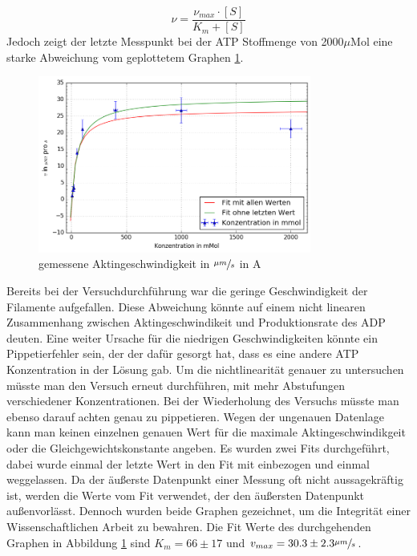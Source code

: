 \begin{equation}
  \nu = \frac{\nu_{max} \cdot [S]}{K_m + [S]}
  \label{equ:michaelis_menten}
\end{equation}
Jedoch zeigt der letzte Messpunkt bei der ATP Stoffmenge von 2000$\mu \text{Mol}$ eine starke
Abweichung vom geplottetem Graphen \ref{fig:normal_speed}.
\begin{figure}[h]
  \centering
  \includegraphics[width=0.8\textwidth]{bilder/both_fits.png}
  \caption{gemessene Aktingeschwindigkeit in $\sfrac{\mu m}{s}$ in A}
  \label{fig:normal_speed}
\end{figure}
Bereits bei der Versuchdurchführung war die geringe Geschwindigkeit der Filamente aufgefallen.
Diese Abweichung könnte auf einem nicht linearen Zusammenhang zwischen
Aktingeschwindikeit und Produktionsrate des ADP deuten.
Eine weiter Ursache für die niedrigen Geschwindigkeiten könnte ein Pippetierfehler sein,
der der dafür gesorgt hat, dass es eine andere ATP Konzentration in der Lösung gab. 
Um die nichtlinearität genauer zu untersuchen müsste man den Versuch erneut durchführen,
mit mehr Abstufungen verschiedener Konzentrationen.
Bei der Wiederholung des Versuchs müsste man ebenso darauf achten genau zu pippetieren.
Wegen der ungenauen Datenlage kann man keinen einzelnen genauen Wert für die maximale
Aktingeschwindikgeit oder die Gleichgewichtskonstante angeben.
Es wurden zwei Fits durchgeführt, dabei wurde einmal der letzte Wert in den Fit mit einbezogen und einmal weggelassen. Da der äußerste Datenpunkt einer Messung oft nicht aussagekräftig ist,
werden die Werte vom Fit verwendet, der den äußersten Datenpunkt außenvorlässt.
Dennoch wurden beide Graphen gezeichnet, um die Integrität einer Wissenschaftlichen Arbeit zu bewahren.
Die Fit Werte des durchgehenden Graphen in Abbildung \ref{fig:normal_speed} sind $K_m = 66 \pm 17$ und $v_{max} = 30.3 \pm 2.3 \sfrac{\mu m}{s}$.\\ 
